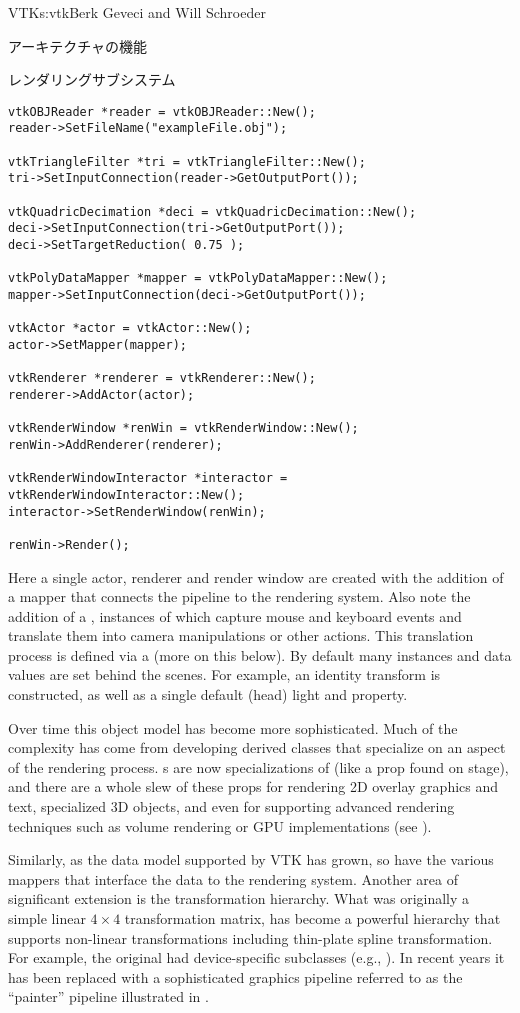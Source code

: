 \begin{aosachapter}{VTK}{s:vtk}{Berk Geveci and Will Schroeder}
\begin{aosasect1}{アーキテクチャの機能}
\begin{aosasect2}{レンダリングサブシステム}
\begin{verbatim}
vtkOBJReader *reader = vtkOBJReader::New();
reader->SetFileName("exampleFile.obj");

vtkTriangleFilter *tri = vtkTriangleFilter::New();
tri->SetInputConnection(reader->GetOutputPort());

vtkQuadricDecimation *deci = vtkQuadricDecimation::New();
deci->SetInputConnection(tri->GetOutputPort());
deci->SetTargetReduction( 0.75 );

vtkPolyDataMapper *mapper = vtkPolyDataMapper::New();
mapper->SetInputConnection(deci->GetOutputPort());

vtkActor *actor = vtkActor::New();
actor->SetMapper(mapper);

vtkRenderer *renderer = vtkRenderer::New();
renderer->AddActor(actor);

vtkRenderWindow *renWin = vtkRenderWindow::New();
renWin->AddRenderer(renderer);

vtkRenderWindowInteractor *interactor = vtkRenderWindowInteractor::New();
interactor->SetRenderWindow(renWin);

renWin->Render();
\end{verbatim}

Here a single actor, renderer and render window are created with the
addition of a mapper that connects the pipeline to the rendering
system. Also note the addition of a ,
instances of which capture mouse and keyboard events and translate
them into camera manipulations or other actions. This translation
process is defined via a  (more on this
below). By default many instances and data values are set behind the
scenes. For example, an identity transform is constructed, as well as a
single default (head) light and property.

Over time this object model has become more sophisticated. Much of the
complexity has come from developing derived classes that specialize on
an aspect of the rendering process. s are now
specializations of  (like a prop found on stage), and
there are a whole slew of these props for rendering 2D overlay
graphics and text, specialized 3D objects, and even for supporting
advanced rendering techniques such as volume rendering or GPU
implementations (see ).

Similarly, as the data model supported by VTK has grown, so have the
various mappers that interface the data to the rendering
system. Another area of significant extension is the transformation
hierarchy. What was originally a simple linear $4{\times}4$
transformation matrix, has become a powerful hierarchy that supports
non-linear transformations including thin-plate spline
transformation. For example, the original  had
device-specific subclasses (e.g., ). In
recent years it has been replaced with a sophisticated graphics
pipeline referred to as the ``painter'' pipeline illustrated in
.


\end{aosasect2}
\end{aosasect1}
\end{aosachapter}
